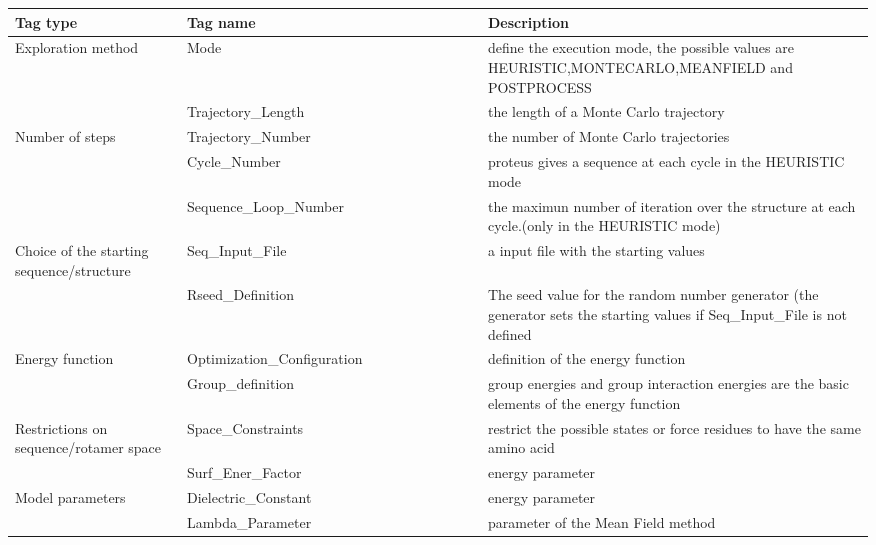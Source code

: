 \documentclass[a4paper,12pt]{article}
\begin{document}
    \begin{table}[!htbp]
      \centering


      \begin{tabular}{|p{0.2\linewidth}|p{0.35\linewidth}|p{0.45\linewidth}|}

        \hline
        Tag type  & Tag name & Description \\
        \hline
          Exploration method  & Mode &  define the execution mode, the possible values are  HEURISTIC,MONTECARLO,MEANFIELD and POSTPROCESS  \\  \hline    
                        & Trajectory\_Length  &  the length of a Monte Carlo trajectory \\  \cline{2-3}
        Number of steps & Trajectory\_Number  &  the number of Monte Carlo trajectories    \\  \cline{2-3}
                        & Cycle\_Number  &    proteus gives a sequence at each cycle in the HEURISTIC mode   \\ \cline{2-3}  
                        & Sequence\_Loop\_Number  &  the maximun number of iteration over the structure at each cycle.(only in the HEURISTIC mode)    \\ \hline  
        Choice of the starting sequence/structure &  Seq\_Input\_File &   a input file with the starting values    \\ \cline{2-3}
                                                  & Rseed\_Definition  &   The seed value for the random number generator (the generator sets the starting values if Seq\_Input\_File is not defined   \\    \hline 
        Energy function &  Optimization\_Configuration &   definition of the energy function\\               \cline{2-3}
                        &  Group\_definition &   group energies and group interaction energies are the basic elements of the energy function\\  \hline  
        Restrictions on sequence/rotamer space & Space\_Constraints   &  restrict the possible states or force residues to have the same amino acid  \\ \hline                
                         & Surf\_Ener\_Factor  &   energy parameter\\               \cline{2-3}
        Model parameters & Dielectric\_Constant &  energy parameter \\               \cline{2-3}
                         & Lambda\_Parameter & parameter of the Mean Field method \\              \cline{2-3} 

\end{tabular}
\end{table}
\end{document}
